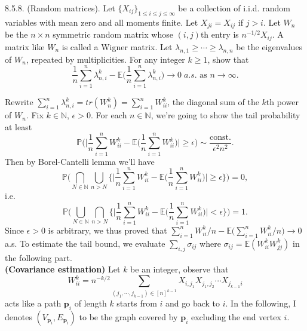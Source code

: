 \begin{exercise}8.5.8. (Random matrices). Let $\{X_{ij}\}_{1\leq i\leq j\leq\infty}$ be a collection of
i.i.d. random variables with mean zero and all moments finite. Let $X_{ji}= X_{ij}$ if $j > i$. Let $W_n$ be the $n\times n$ symmetric random matrix whose $(i, j)$th entry is
$n^{-1/2}X_{ij}$. A matrix like $W_n$ is called a Wigner matrix. Let $\lambda_{n,1} \geq\cdots\geq\lambda_{n,n}$ be
the eigenvalues of $W_n$, repeated by multiplicities. For any integer $k \geq 1$, show that
\begin{equation*}
    \frac{1}{n}\sum_{i=1}^n\lambda_{n,i}^k-\mathbb{E}\Big(\frac{1}{n}\sum_{i=1}^n\lambda_{n,i}^k\Big)\rightarrow 0\;a.s.\text{ as }n\rightarrow\infty.
\end{equation*}
\end{exercise}
\begin{answer}
Rewrite $\sum_{i=1}^n\lambda^k_{n,i}=tr(W_n^k)=\sum_{i=1}^nW^k_{ii}$, the diagonal sum of the $k$th power of $W_n$. Fix $k\in\mathbb{N}$, $\epsilon>0$. For each $n\in\mathbb{N}$, we're going to show the tail probability at least
\begin{equation*}
\mathbb{P}\Big(\Big|\frac{1}{n}\sum_{i=1}^nW^k_{ii}-\mathbb{E}\Big(\frac{1}{n}\sum_{i=1}^nW_{ii}^k\Big)\Big|\geq\epsilon\Big)\sim\frac{\text{const.}}{\epsilon^2n^2}.
\end{equation*}
Then by Borel-Cantelli lemma we'll have
\begin{equation*}
    \mathbb{P}\Big(\bigcap_{N\in\mathbb{N}}\bigcup_{n>N}\Big\{\Big|\frac{1}{n}\sum_{i=1}^nW^k_{ii}-\mathbb{E}\Big(\frac{1}{n}\sum_{i=1}^nW_{ii}^k\Big)\Big|\geq\epsilon\Big\}\Big)=0,
\end{equation*}
i.e.
\begin{equation*}
    \mathbb{P}\Big(\bigcup_{N\in\mathbb{N}}\bigcap_{n>N}\Big\{\Big|\frac{1}{n}\sum_{i=1}^nW^k_{ii}-\mathbb{E}\Big(\frac{1}{n}\sum_{i=1}^nW_{ii}^k\Big)\Big|<\epsilon\Big\}\Big)=1.
\end{equation*}
Since $\epsilon>0$ is arbitrary, we thus proved that $\sum_{i=1}^nW_{ii}^k/n-\mathbb{E}\big(\sum_{i=1}^nW^k_{ii}/n\big)\rightarrow 0$ a.s. To estimate the tail bound, we evaluate $\sum_{i,j}\sigma_{ij}$ where $\sigma_{ij}=\mathbb{E}(W_{ii}^kW_{jj}^k)$ in the following part.\\

\textbf{(Covariance estimation)} Let $k$ be an integer, observe that 
\begin{equation*}
W_{ii}^k=n^{-k/2}\sum_{(j_1,\cdots,j_{k-1})\in[n]^{k-1}}X_{i,j_1}X_{j_1,j_2}\cdots X_{j_{k-1}i}
\end{equation*}
acts like a path $\mathbf{p}_i$ of length $k$ starts from $i$ and go back to $i$. In the following, I denotes $(V_{\mathbf{p}_i}, E_{\mathbf{p}_i})$ to be the graph covered by $\mathbf{p}_i$ excluding the end vertex $i$.\\


\end{answer}
